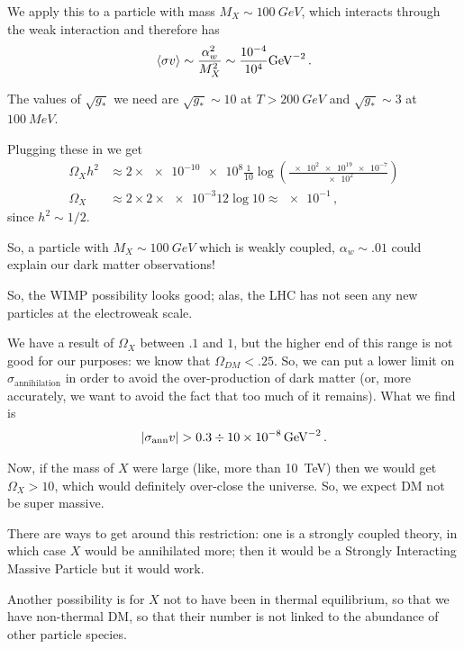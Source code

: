 \documentclass[main.tex]{subfiles}
\begin{document}
We apply this to a particle with mass \(M_X \sim \SI{100}{GeV}\), which interacts through the weak interaction and therefore has 
%
\begin{align}
\expval{\sigma v} \sim \frac{\alpha_{w}^2}{M_X^2} \sim \frac{\num{e-4}}{\num{e4}} \SI{}{GeV^{-2}}
\,.
\end{align}

The values of \(\sqrt{g_*}\) we need are \(\sqrt{g_*}\sim 10\) at \(T > \SI{200}{GeV}\) and \(\sqrt{g_*} \sim 3\) at \(\SI{100}{MeV}\).

Plugging these in we get 
%
\begin{align}
\Omega_{X} h^2 &\approx 2 \times \num{e-10} \num{e8} \frac{1}{10} \log(\frac{\num{e2} \num{e19} \num{e-7}}{\num{e2}})  \\
\Omega_{X} &\approx 2 \times  2\times  \num{e-3} 12 \log 10 \approx \num{e-1}
\,,
\end{align}
%
since \(h^2 \sim 1/2\).

So, a particle with \(M_X \sim \SI{100}{GeV}\) which is weakly coupled, \(\alpha_{w} \sim \num{.01}\) could explain our dark matter observations!

So, the WIMP possibility looks good; alas, the LHC has not seen any new particles at the electroweak scale. 

We have a result of \(\Omega_{X}\) between \(\num{.1}\) and \(\num{1}\), but the higher end of this range is not good for our purposes: we know that \(\Omega_{DM} < \num{.25}\). 
So, we can put a lower limit on \(\sigma _{\text{annihilation}}\) in order to avoid the over-production of dark matter (or, more accurately, we want to avoid the fact that too much of it remains).
What we find is 
%
\begin{align}
\abs{\sigma _{\text{ann}} v} >  \num{.3} \divisionsymbol \SI{10e-8}{GeV^{-2}}
\,.
\end{align}

Now, if the mass of \(X\) were large (like, more than \SI{10}{TeV}) then we would get \(\Omega_{X} > 10\), which would definitely over-close the universe. So, we expect DM not be super massive. 

There are ways to get around this restriction: one is a strongly coupled theory, in which case \(X\) would be annihilated more; then it would be a Strongly Interacting Massive Particle but it would work. 

Another possibility is for \(X\) not to have been in thermal equilibrium, so that we have non-thermal DM, so that their number is not linked to the abundance of other particle species. 
\end{document}
